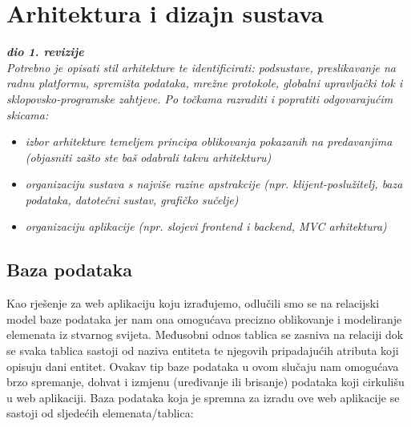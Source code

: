 \chapter{Arhitektura i dizajn sustava}
		
		\textbf{\textit{dio 1. revizije}}\\

		\textit{ Potrebno je opisati stil arhitekture te identificirati: podsustave, preslikavanje na radnu platformu, spremišta podataka, mrežne protokole, globalni upravljački tok i sklopovsko-programske zahtjeve. Po točkama razraditi i popratiti odgovarajućim skicama:}
	\begin{itemize}
		\item 	\textit{izbor arhitekture temeljem principa oblikovanja pokazanih na predavanjima (objasniti zašto ste baš odabrali takvu arhitekturu)}
		\item 	\textit{organizaciju sustava s najviše razine apstrakcije (npr. klijent-poslužitelj, baza podataka, datotečni sustav, grafičko sučelje)}
		\item 	\textit{organizaciju aplikacije (npr. slojevi frontend i backend, MVC arhitektura) }		
	\end{itemize}

		\eject
		

		

				
		\section{Baza podataka}
		
		
		\textnormal{Kao rješenje za web aplikaciju koju izrađujemo, odlučili smo se na relacijski model baze podataka jer nam ona omogućava precizno oblikovanje i modeliranje elemenata iz stvarnog svijeta. Međusobni odnos tablica se zasniva na relaciji dok se svaka tablica sastoji od naziva entiteta te njegovih pripadajućih atributa koji opisuju dani entitet. Ovakav tip baze podataka u ovom slučaju nam omogućava brzo spremanje, dohvat i izmjenu (uređivanje ili brisanje) podataka koji cirkulišu u web aplikaciji. Baza podataka koja je spremna za izradu ove web aplikacije se sastoji od sljedećih elemenata/tablica:}
		
